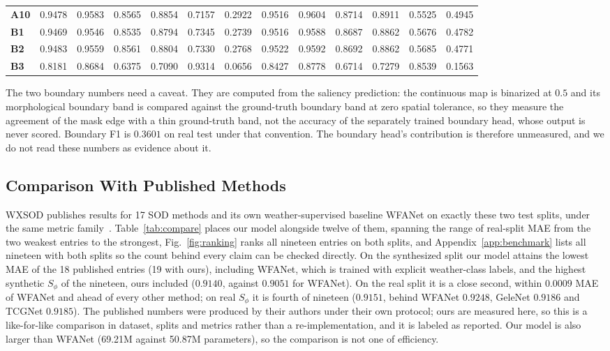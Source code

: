 \documentclass[10pt,a4paper,twocolumn,twoside]{article}
\begin{document}
\begin{table}[!t]
\begin{tabular}{@{}lcccccc@{\hspace{10pt}}cccccc@{}}
\textbf{A10} & 0.9478 & 0.9583 & 0.8565 & 0.8854 & 0.7157 & 0.2922 & 0.9516 & 0.9604 & 0.8714 & 0.8911 & 0.5525 & 0.4945 \\
\textbf{B1} & 0.9469 & 0.9546 & 0.8535 & 0.8794 & 0.7345 & 0.2739 & 0.9516 & 0.9588 & 0.8687 & 0.8862 & 0.5676 & 0.4782 \\
\textbf{B2} & 0.9483 & 0.9559 & 0.8561 & 0.8804 & 0.7330 & 0.2768 & 0.9522 & 0.9592 & 0.8692 & 0.8862 & 0.5685 & 0.4771 \\
\textbf{B3} & 0.8181 & 0.8684 & 0.6375 & 0.7090 & 0.9314 & 0.0656 & 0.8427 & 0.8778 & 0.6714 & 0.7279 & 0.8539 & 0.1563 \\
\bottomrule
\end{tabular}
\end{table}


The two boundary numbers need a caveat. They are computed from the saliency prediction:
the continuous map is binarized at $0.5$ and its morphological boundary band is compared
against the ground-truth boundary band at zero spatial tolerance, so they measure the
agreement of the mask edge with a thin ground-truth band, not the accuracy of the separately
trained boundary head, whose output is never scored. Boundary F1 is $0.3601$ on real test under
that convention. The boundary head's contribution is therefore unmeasured, and we do not read
these numbers as evidence about it.

\subsection{Comparison With Published Methods}
\label{sec:compare}
WXSOD publishes results for 17 SOD methods and its own weather-supervised baseline WFANet on
exactly these two test splits, under the same metric family~\cite{wxsod2025}.
Table~\ref{tab:compare} places our model alongside twelve of them, spanning the range of
real-split MAE from the two weakest entries to the strongest, Fig.~\ref{fig:ranking} ranks
all nineteen entries on both splits, and Appendix~\ref{app:benchmark} lists all nineteen
with both splits so the count behind every claim can be checked directly.
On the synthesized split our model attains the lowest MAE of the 18 published entries (19
with ours), including WFANet, which is trained with explicit weather-class labels, and the
highest synthetic $S_\phi$ of the nineteen, ours included ($0.9140$, against $0.9051$ for
WFANet).
On the real split it is a close second, within $0.0009$ MAE of WFANet and ahead of every
other method; on real $S_\phi$ it is fourth of nineteen ($0.9151$, behind WFANet $0.9248$,
GeleNet $0.9186$ and TCGNet $0.9185$).
The published numbers were produced by their authors under their own protocol; ours are
measured here, so this is a like-for-like comparison in dataset, splits and metrics rather
than a re-implementation, and it is labeled as reported.
Our model is also larger than WFANet (69.21M against 50.87M parameters), so the comparison is
not one of efficiency.
\end{document}
